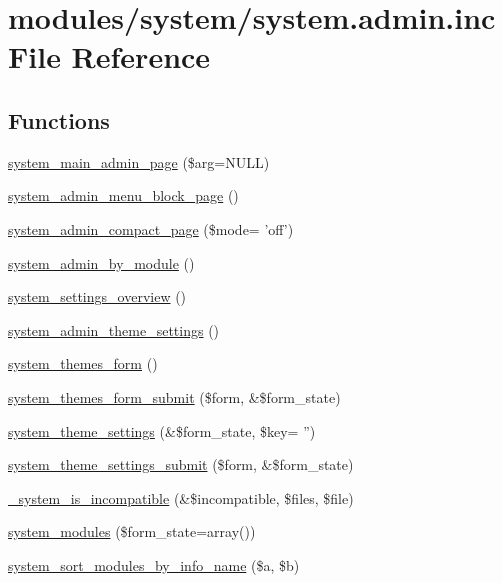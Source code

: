 \hypertarget{system_8admin_8inc}{
\section{modules/system/system.admin.inc File Reference}
\label{system_8admin_8inc}
}
\subsection*{Functions}
\begin{CompactItemize}
\item 
\hyperlink{system_8admin_8inc_b11f14a0765894140af08173415eea1d}{system\_\-main\_\-admin\_\-page} (\$arg=NULL)
\item 
\hyperlink{system_8admin_8inc_de03d94c63a6cce2148fc06982f510cb}{system\_\-admin\_\-menu\_\-block\_\-page} ()
\item 
\hyperlink{system_8admin_8inc_b1957cfd893fb50794286ea7c84589e6}{system\_\-admin\_\-compact\_\-page} (\$mode= 'off')
\item 
\hyperlink{system_8admin_8inc_1f1316cfc11f0f46704c8765a9919c16}{system\_\-admin\_\-by\_\-module} ()
\item 
\hyperlink{system_8admin_8inc_8f7e131c5d7173602739c67ef91093de}{system\_\-settings\_\-overview} ()
\item 
\hyperlink{group__forms_g1dd7e9d8accd39dc5991233d9d1b8467}{system\_\-admin\_\-theme\_\-settings} ()
\item 
\hyperlink{group__forms_g8f88b0723dcb0f229a0d8b10687b8059}{system\_\-themes\_\-form} ()
\item 
\hyperlink{system_8admin_8inc_befe4cab3ed3a80f4d37af3eb74df33f}{system\_\-themes\_\-form\_\-submit} (\$form, \&\$form\_\-state)
\item 
\hyperlink{group__forms_g7cc637f50b1399befe30a24af784817b}{system\_\-theme\_\-settings} (\&\$form\_\-state, \$key= '')
\item 
\hyperlink{system_8admin_8inc_5403622cfdf9642a628637c4b4836c72}{system\_\-theme\_\-settings\_\-submit} (\$form, \&\$form\_\-state)
\item 
\hyperlink{system_8admin_8inc_d026206dcc488d13c621043f8f6312dd}{\_\-system\_\-is\_\-incompatible} (\&\$incompatible, \$files, \$file)
\item 
\hyperlink{group__forms_gc1f714517f9c92ec183a05d6f07ccdf1}{system\_\-modules} (\$form\_\-state=array())
\item 
\hyperlink{system_8admin_8inc_ff1678b51b0d78a4c27b8e05b4f6621b}{system\_\-sort\_\-modules\_\-by\_\-info\_\-name} (\$a, \$b)

\end{CompactItemize}
